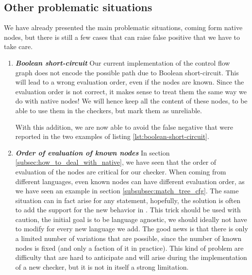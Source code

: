 \subsection{Other problematic situations}
\label{subsec:other_problematic_situation}
	
We have already presented the main problematic situations, coming form native nodes, but there is still a few cases that can raise false positive that we have to take care.

\begin{enumerate}
	\item \textbf{\textit{Boolean short-circuit}} \newline 
	\label{subsubsec:boolean_short_circuit}
	Our current implementation of the control flow graph does not encode the possible path due to Boolean short-circuit. 
	This will lead to a wrong evaluation order, even if the nodes are known. 
	Since the evaluation order is not correct, it makes sense to treat them the same way we do with native nodes! 
	We will hence keep all the content of these nodes, to be able to use them in the checkers, but mark them as unreliable. 
	
	
	
	With this addition, we are now able to avoid the false negative that were reported in the two examples of listing \ref{lst:boolean-short-circuit}.
	
	\item \textbf{\textit{Order of evaluation of known nodes}} \newline 
	\label{subsubsec:evaluation_known_nodes}
	In section \ref{subsec:how_to_deal_with_native}, we have seen that the order of evaluation of the nodes are critical for our checker.
	When coming from different languages, even known nodes can have different evaluation order, as we have seen an example in section \ref{subsubsec:match_tree_cfg}. 
	The same situation can in fact arise for any statement, hopefully, the solution is often to add the support for the new behavior in \slang{}.
	This trick should be used with caution, the initial goal is to be language agnostic, we should ideally not have to modify \slang{} for every new language we add. 
	The good news is that there is only a limited number of variations that are possible, since the number of known nodes is fixed (and only a faction of it in practice). 
	This kind of problem are difficulty that are hard to anticipate and will arise during the implementation of a new checker, but it is not in itself a strong limitation.
	

\end{enumerate}
